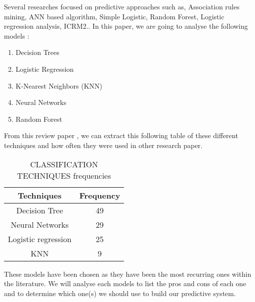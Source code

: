 Several researches focused on predictive approaches such as, Association rules mining, ANN based algorithm, Simple Logistic, 
 Random Forest, Logistic regression analysis, ICRM2.\cite{mduma_survey_2019}. 
In this paper, we are going to analyse the following models \cite{mduma_survey_2019,quinlan_induction_1986,yadav_mining_2012,heredia_student_2015,ramirez_prediction_2018,cox_regression_1958,perez_modelo_2018,pandey_data_2011,cover_nearest_1967,mardolkar_forecasting_2020,zhang_neural_2000,rudin_stop_2019,siri_predicting_2015,m_alban_she_is_with_the_faculty_of_engineering_and_applied_sciences_of_the_technical_university_cotopaxi_neural_2019,boser_training_1992,lee_machine_2019,behr_early_2020,friedman_stochastic_2002,eckert_analysis_2015,tenpipat_student_2020,liang_machine_2016,liang_big_2016,fischer_angulo_modelo_2012,miranda_analysis_2017,viloria_integration_2019,kemper_predicting_2020,agrusti_university_2019}:
\begin{enumerate}
\item Decision Trees
\item Logistic Regression
\item K-Nearest Neighbors (KNN)
\item Neural Networks
\item Random Forest
\end{enumerate}
From this review paper \cite{agrusti_university_2019}, we can extract this following table of these different techniques and how often they were used in other research paper.
\begin{table}[H]
    \centering
    \caption{CLASSIFICATION TECHNIQUES frequencies\cite{agrusti_university_2019}}
    \begin{tabular}{|c|c|}
        \hline
        \textbf{Techniques} & \textbf{Frequency}\\
        \hline
        Decision Tree & 49\\
        \hline
        Neural Networks & 29\\
        \hline
        Logistic regression & 25\\
        \hline
        KNN & 9\\
        \hline
    \end{tabular}
    \label{tab:class_tech_freq_agrusti}
\end{table}
These models have been chosen as they have been the most recurring ones within the literature. We will analyse each models to list the pros and cons of each one and to determine which one(s) we should use to build our predictive system.


